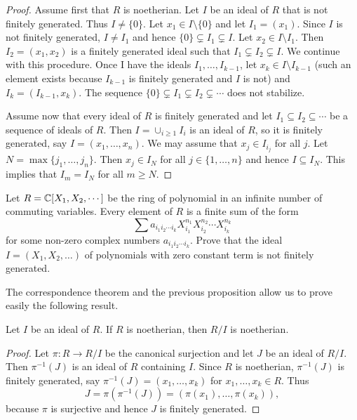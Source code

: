 \begin{proof}
	Assume first that $R$ is noetherian. Let $I$ be an ideal of $R$ that is not finitely generated. 
	Thus $I\ne\{0\}$. Let $x_1\in I\setminus\{0\}$ and let $I_1=(x_1)$. Since $I$ is not finitely
	generated, $I\ne I_1$ and hence   
	$\{0\}\subsetneq I_1\subsetneq I$. Let $x_2\in I\setminus I_1$. Then
	$I_2=(x_1,x_2)$ is a finitely generated ideal such that 
	$I_1\subsetneq I_2\subsetneq I$. We continue with this 
	procedure. Once I have the ideals $I_1,\dots,I_{k-1}$, let 
	$x_k\in I\setminus I_{k-1}$ (such an element exists because $I_{k-1}$ is finitely generated
	and $I$ is not) and $I_k=(I_{k-1},x_k)$. The sequence
	$\{0\}\subsetneq I_1\subsetneq I_2\subsetneq\cdots$ does not stabilize.  
	
	Assume now that every ideal of $R$ is finitely generated and 
	let $I_1\subseteq I_2\subseteq\cdots$ be a sequence of ideals of $R$. Then
	$I=\cup_{i\geq1}I_i$ is an ideal of $R$, so it is finitely generated, say
	$I=(x_1,\dots,x_n)$. We may assume that $x_j\in I_{i_j}$ for all $j$. Let 
	$N=\max\{j_1,\dots,j_n\}$. Then 
	$x_j\in I_N$ for all $j\in\{1,\dots,n\}$ 
	and hence $I\subseteq I_N$. This implies that 
	$I_m=I_N$ for all $m\geq N$. 
\end{proof}

\begin{exercise}
	Let $R=\mathbb{C}[X_1,X_2,\cdots]$ be the ring of polynomial in an infinite number of 
	commuting variables. 
	Every element of $R$ is a finite sum
	of the form 
	\[
	\sum a_{i_1i_2\cdots i_k}X_{i_1}^{n_1}X_{i_2}^{n_2}\cdots X_{i_k}^{n_k}
	\]
	for some non-zero complex numbers 
	$a_{i_1i_2\cdots i_k}$. 
	Prove that the ideal $I=(X_1,X_2,\dots)$ of polynomials 
	with zero constant term is not finitely generated. 
\end{exercise}

The correspondence theorem and the previous proposition 
allow us to prove easily the following result. 

\begin{proposition}
	Let $I$ be an ideal of $R$. If $R$ is noetherian, then $R/I$ is noetherian.
\end{proposition}

\begin{proof}
	Let $\pi\colon R\to R/I$ be the canonical surjection and let $J$ be an ideal of $R/I$. 
	Then $\pi^{-1}(J)$ is an ideal of $R$ containing $I$. Since 
	$R$ is noetherian, $\pi^{-1}(J)$ is finitely generated, say 
	$\pi^{-1}(J)=(x_1,\dots,x_k)$ for $x_1,\dots,x_k\in R$. Thus 
	\[
	J=\pi(\pi^{-1}(J))=(\pi(x_1),\dots,\pi(x_k)),
	\]
	because $\pi$ is surjective 
	and hence $J$ is finitely generated. 
\end{proof}

